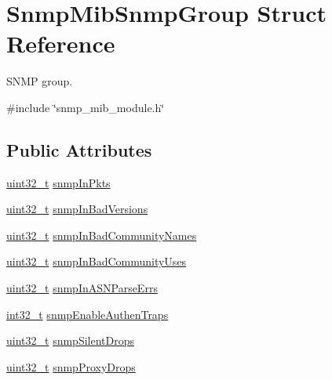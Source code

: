 \hypertarget{structSnmpMibSnmpGroup}{}\section{Snmp\+Mib\+Snmp\+Group Struct Reference}
\label{structSnmpMibSnmpGroup}


S\+N\+MP group.  




{\ttfamily \#include \char`\"{}snmp\+\_\+mib\+\_\+module.\+h\char`\"{}}

\subsection*{Public Attributes}
\begin{DoxyCompactItemize}
\item 
\hyperlink{stdint_8h_a435d1572bf3f880d55459d9805097f62}{uint32\+\_\+t} \hyperlink{structSnmpMibSnmpGroup_ae3c9cf3b1dbc8d94a384c3067aa4f951}{snmp\+In\+Pkts}
\item 
\hyperlink{stdint_8h_a435d1572bf3f880d55459d9805097f62}{uint32\+\_\+t} \hyperlink{structSnmpMibSnmpGroup_a33f4ee934c30f902620f9150362843cc}{snmp\+In\+Bad\+Versions}
\item 
\hyperlink{stdint_8h_a435d1572bf3f880d55459d9805097f62}{uint32\+\_\+t} \hyperlink{structSnmpMibSnmpGroup_ac379a1c1eafa52ee080cd9c72920bfd3}{snmp\+In\+Bad\+Community\+Names}
\item 
\hyperlink{stdint_8h_a435d1572bf3f880d55459d9805097f62}{uint32\+\_\+t} \hyperlink{structSnmpMibSnmpGroup_a25ad2a7ed5cc593fa0e91cf8ecee60ea}{snmp\+In\+Bad\+Community\+Uses}
\item 
\hyperlink{stdint_8h_a435d1572bf3f880d55459d9805097f62}{uint32\+\_\+t} \hyperlink{structSnmpMibSnmpGroup_a8112da17638dc8c287c6ede336b2af48}{snmp\+In\+A\+S\+N\+Parse\+Errs}
\item 
\hyperlink{stdint_8h_ab1967d8591af1a4e48c37fd2b0f184d0}{int32\+\_\+t} \hyperlink{structSnmpMibSnmpGroup_a7ea451142bc21c679f76a7c33e7cb514}{snmp\+Enable\+Authen\+Traps}
\item 
\hyperlink{stdint_8h_a435d1572bf3f880d55459d9805097f62}{uint32\+\_\+t} \hyperlink{structSnmpMibSnmpGroup_acc45dad5896027bc5abcfc83a4bab3b7}{snmp\+Silent\+Drops}
\item 
\hyperlink{stdint_8h_a435d1572bf3f880d55459d9805097f62}{uint32\+\_\+t} \hyperlink{structSnmpMibSnmpGroup_ac011afb11f94e119fc8c890604b55902}{snmp\+Proxy\+Drops}
\end{DoxyCompactItemize}


